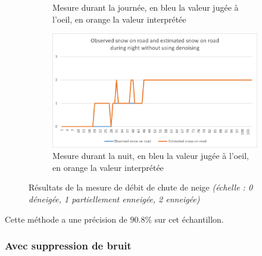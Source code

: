 \begin{figure}[H]
\begin{subfigure}{.45\textwidth}
        \caption{Mesure durant la journée, en bleu la valeur jugée à l'oeil, en orange la valeur interprétée}
        \label{fig:SnowOnRoad_noise_dayResults}
    \end{subfigure}
    \hfill
    \begin{subfigure}{.45\textwidth}
        \includegraphics[width=\linewidth]{Images/computer_vision/snowOnRoad/nightResults_noise.png}
        \caption{Mesure durant la nuit, en bleu la valeur jugée à l'oeil, en orange la valeur interprétée}
        \label{fig:SnowOnRoad_noise_nightResults}
    \end{subfigure}
    \caption{Résultats de la mesure de débit de chute de neige \emph{(échelle : 0 déneigée, 1 partiellement enneigée, 2 enneigée)}}
    \label{fig:SnowOnRoad_noise_results}
\end{figure}
Cette méthode a une précision de $90.8\%$ sur cet échantillon.

\subsubsection{Avec suppression de bruit}

